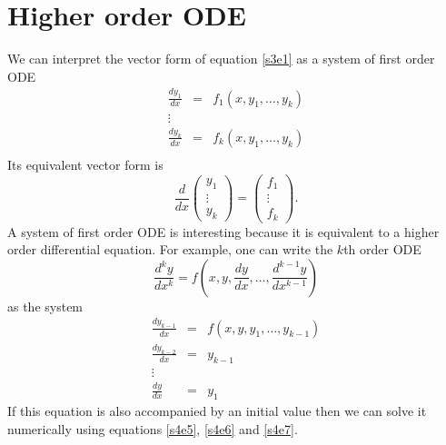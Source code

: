 \documentclass{article}
\numberwithin{equation}{section}
\begin{document}
\section{Higher order ODE}\label{s5}
We can interpret the vector form of equation \eqref{s3e1} as a system of 
first order ODE
\begin{eqnarray*}
\frac{dy_1}{dx} &=& f_1(x, y_1, \ldots, y_k) \\
\vdots \\
\frac{dy_k}{dx} &=& f_k(x, y_1, \ldots, y_k) \\
\end{eqnarray*}
Its equivalent vector form is
\begin{equation}\label{s5e1}
\frac{d}{dx}\begin{pmatrix}y_1 \\ \vdots \\ y_k\end{pmatrix} = 
\begin{pmatrix}f_1 \\ \vdots \\ f_k\end{pmatrix}.
\end{equation}
A system of first order ODE is interesting because it is equivalent to
a higher order differential equation. For example, one can write the $k$th
order ODE
\begin{equation}\label{s5e2}
\frac{d^ky}{dx^k} = f\left(x, y, \frac{dy}{dx}, \ldots, 
	\frac{d^{k-1}y}{dx^{k-1}}\right)
\end{equation}
as the system
\begin{eqnarray*}
\frac{dy_{k-1}}{dx} &=& f(x, y, y_1, \ldots, y_{k-1}) \\
\frac{dy_{k-2}}{dx} &=& y_{k-1} \\
\vdots \\
\frac{dy}{dx} &=& y_1
\end{eqnarray*}
If this equation is also accompanied by an initial value then we can solve
it numerically using equations \eqref{s4e5}, \eqref{s4e6} and \eqref{s4e7}.
\end{document}
